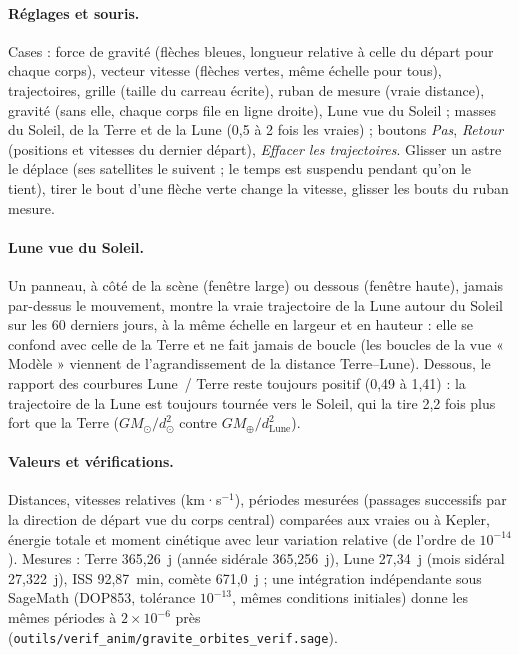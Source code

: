 \paragraph{Réglages et souris.} Cases : force de gravité (flèches bleues, longueur relative à celle du départ pour
chaque corps), vecteur vitesse (flèches vertes, même échelle pour tous), trajectoires, grille (taille du carreau
écrite), ruban de mesure (vraie distance), gravité (sans elle, chaque corps file en ligne droite), Lune vue du Soleil ;
masses du Soleil, de la Terre et de la Lune (0,5 à 2 fois les vraies) ; boutons \emph{Pas}, \emph{Retour} (positions et
vitesses du dernier départ), \emph{Effacer les trajectoires}. Glisser un astre le déplace (ses satellites le suivent ;
le temps est suspendu pendant qu'on le tient), tirer le bout d'une flèche verte change la vitesse, glisser les bouts du
ruban mesure.

\paragraph{Lune vue du Soleil.} Un panneau, à côté de la scène (fenêtre large) ou dessous (fenêtre haute), jamais par-dessus le mouvement, montre la vraie trajectoire de la Lune autour du Soleil sur les 60 derniers
jours, à la même échelle en largeur et en hauteur : elle se confond avec celle de la Terre et ne fait jamais de boucle
(les boucles de la vue « Modèle » viennent de l'agrandissement de la distance Terre--Lune). Dessous, le rapport des
courbures Lune~/ Terre reste toujours positif (0,49 à 1,41) : la trajectoire de la Lune est toujours tournée vers le
Soleil, qui la tire 2,2 fois plus fort que la Terre ($GM_\odot/d_\odot^2$ contre $GM_\oplus/d_{\mathrm{Lune}}^2$).

\paragraph{Valeurs et vérifications.} Distances, vitesses relatives (km·s$^{-1}$), périodes mesurées (passages
successifs par la direction de départ vue du corps central) comparées aux vraies ou à Kepler, énergie totale et moment
cinétique avec leur variation relative (de l'ordre de $10^{-14}$). Mesures : Terre 365,26~j (année sidérale
365,256~j), Lune 27,34~j (mois sidéral 27,322~j), ISS 92,87~min, comète 671,0~j ; une intégration indépendante sous
SageMath (DOP853, tolérance $10^{-13}$, mêmes conditions initiales) donne les mêmes périodes à $2\times10^{-6}$ près
(\texttt{outils/verif\_anim/gravite\_orbites\_verif.sage}).

